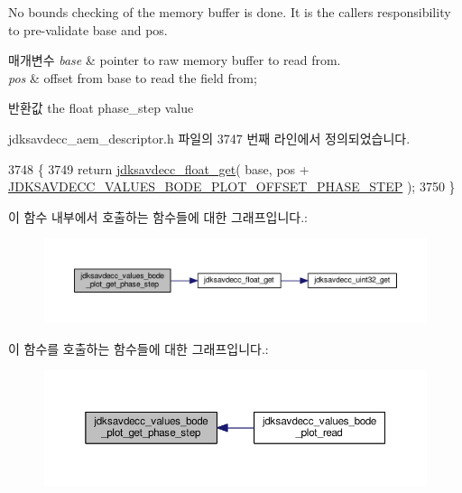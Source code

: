 No bounds checking of the memory buffer is done. It is the caller\textquotesingle{}s responsibility to pre-\/validate base and pos.


\begin{DoxyParams}{매개변수}
{\em base} & pointer to raw memory buffer to read from. \\
\hline
{\em pos} & offset from base to read the field from; \\
\hline
\end{DoxyParams}
\begin{DoxyReturn}{반환값}
the float phase\+\_\+step value 
\end{DoxyReturn}


jdksavdecc\+\_\+aem\+\_\+descriptor.\+h 파일의 3747 번째 라인에서 정의되었습니다.


\begin{DoxyCode}
3748 \{
3749     \textcolor{keywordflow}{return} \hyperlink{group__endian_gadf6108d4d5f2936dd5018e4b80265c8c}{jdksavdecc\_float\_get}( base, pos + 
      \hyperlink{group__values__bode__plot_gafea355654a51b03321dede7a0bdb17c4}{JDKSAVDECC\_VALUES\_BODE\_PLOT\_OFFSET\_PHASE\_STEP} );
3750 \}
\end{DoxyCode}


이 함수 내부에서 호출하는 함수들에 대한 그래프입니다.\+:
\nopagebreak
\begin{figure}[H]
\begin{center}
\leavevmode
\includegraphics[width=350pt]{group__values__bode__plot_ga824e85667783e7331832dd4163acb9a3_cgraph}
\end{center}
\end{figure}




이 함수를 호출하는 함수들에 대한 그래프입니다.\+:
\nopagebreak
\begin{figure}[H]
\begin{center}
\leavevmode
\includegraphics[width=350pt]{group__values__bode__plot_ga824e85667783e7331832dd4163acb9a3_icgraph}
\end{center}
\end{figure}


